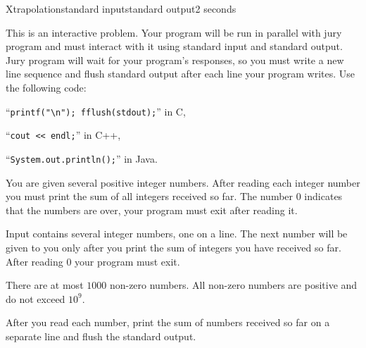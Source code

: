 \begin{problem}{Xtrapolation}{standard input}{standard output}{2 seconds}

This is an interactive problem. Your program will be run in parallel with 
jury program and must interact with it using standard input and standard
output. Jury program will wait for your program's responses, so you
must write a new line sequence and flush standard output after each line 
your program writes. Use the following code:

\begin{shortitems}
\item ``\verb|printf("\n"); fflush(stdout);|'' in C, 
\item ``\verb|cout << endl;|'' in C++, 
\item ``\verb|System.out.println();|'' in Java.
\end{shortitems}

You are given several positive integer numbers. After reading each integer number you must
print the sum of all integers received so far. The number $0$ indicates that the 
numbers are over, your program must exit after reading it.

\InputFile

Input contains several integer numbers, one on a line. The
next number will be given to you only after you print the sum of
integers you have received so far. After reading 0 your program must exit.

There are at most $1000$ non-zero numbers. All non-zero numbers are positive
and do not exceed $10^9$.

\OutputFile

After you read each number, print the sum of numbers received so far on a 
separate line and flush the standard output.

\Example

\begin{example}
%
\end{example}

\end{problem}
